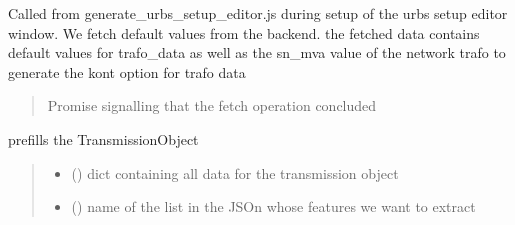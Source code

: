 \documentclass[letterpaper,10pt,english]{sphinxmanual}
\begin{document}
\begin{fulllineitems}
\label{\detokenize{docs_gui/js_api/urbs_editor/transmission_editor:fetchTransmissionProfiles}}
\pysigstartsignatures
{}
\pysigstopsignatures
\sphinxAtStartPar
Called from generate\_urbs\_setup\_editor.js during setup of the urbs setup editor window.
We fetch default values from the backend.
the fetched data contains default values for trafo\_data as well as
the sn\_mva value of the network trafo to generate the kont option for trafo data
\begin{quote}\begin{description}
\sphinxAtStartPar
Promise signalling that the fetch operation concluded

\end{description}\end{quote}

\end{fulllineitems}


\begin{fulllineitems}
\label{\detokenize{docs_gui/js_api/urbs_editor/transmission_editor:prepareCableDataList}}
\pysigstartsignatures
{}
\pysigstopsignatures
\sphinxAtStartPar
prefills the TransmissionObject
\begin{quote}\begin{description}
\begin{itemize}
\item {} 
\sphinxAtStartPar
{} () \textendash{} dict containing all data for the transmission object

\item {} 
\sphinxAtStartPar
{} () \textendash{} name of the list in the JSOn whose features we want to extract

\end{itemize}

\end{description}\end{quote}

\end{fulllineitems}
\end{document}
